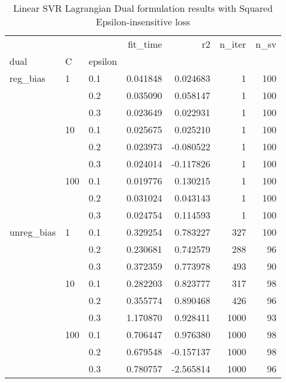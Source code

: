 \begin{table}[H]
\centering
\caption{Linear SVR Lagrangian Dual formulation results with Squared Epsilon-insensitive loss}
\label{linear_lagrangian_dual_l2_svr_cv_results}
\begin{tabular}{lllrrrr}
\toprule
           &     &     &  fit\_time &        r2 &  n\_iter &  n\_sv \\
dual & C & epsilon &           &           &         &       \\
\midrule
reg\_bias & 1   & 0.1 &  0.041848 &  0.024683 &       1 &   100 \\
           &     & 0.2 &  0.035090 &  0.058147 &       1 &   100 \\
           &     & 0.3 &  0.023649 &  0.022931 &       1 &   100 \\
           & 10  & 0.1 &  0.025675 &  0.025210 &       1 &   100 \\
           &     & 0.2 &  0.023973 & -0.080522 &       1 &   100 \\
           &     & 0.3 &  0.024014 & -0.117826 &       1 &   100 \\
           & 100 & 0.1 &  0.019776 &  0.130215 &       1 &   100 \\
           &     & 0.2 &  0.031024 &  0.043143 &       1 &   100 \\
           &     & 0.3 &  0.024754 &  0.114593 &       1 &   100 \\
unreg\_bias & 1   & 0.1 &  0.329254 &  0.783227 &     327 &   100 \\
           &     & 0.2 &  0.230681 &  0.742579 &     288 &    96 \\
           &     & 0.3 &  0.372359 &  0.773978 &     493 &    90 \\
           & 10  & 0.1 &  0.282203 &  0.823777 &     317 &    98 \\
           &     & 0.2 &  0.355774 &  0.890468 &     426 &    96 \\
           &     & 0.3 &  1.170870 &  0.928411 &    1000 &    93 \\
           & 100 & 0.1 &  0.706447 &  0.976380 &    1000 &    98 \\
           &     & 0.2 &  0.679548 & -0.157137 &    1000 &    98 \\
           &     & 0.3 &  0.780757 & -2.565814 &    1000 &    96 \\
\bottomrule
\end{tabular}
\end{table}
